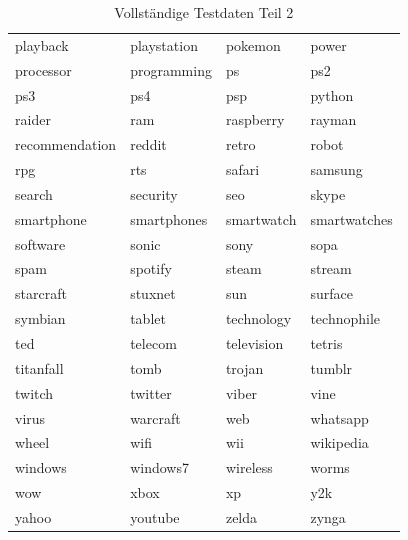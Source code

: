 \documentclass[12pt,a4paper]{report}
\begin{document}
\begin{table}[H]
\begin{center}
\begin{tabular}{l|l|l|l}
\end{tabular}
\end{center}
\end{table}

\newpage
\begin{table}[H]
\caption{Vollständige Testdaten Teil 2}
\begin{center}
\begin{tabular}{l|l|l|l}\\
playback & playstation & pokemon & power\\
processor & programming & ps & ps2\\
ps3 & ps4 & psp & python\\
raider & ram & raspberry & rayman\\
recommendation & reddit & retro & robot\\
rpg & rts & safari & samsung\\
search & security & seo & skype\\
smartphone & smartphones & smartwatch & smartwatches\\
software & sonic & sony & sopa\\
spam & spotify & steam & stream\\
starcraft & stuxnet & sun & surface\\
symbian & tablet & technology & technophile\\
ted & telecom & television & tetris\\
titanfall & tomb & trojan & tumblr\\
twitch & twitter & viber & vine\\
virus & warcraft & web & whatsapp\\
wheel & wifi & wii & wikipedia\\
windows & windows7 & wireless & worms\\
wow & xbox & xp & y2k\\
yahoo & youtube & zelda & zynga\\

\end{tabular}
\end{center}
\end{table}

\newpage
\end{document}
